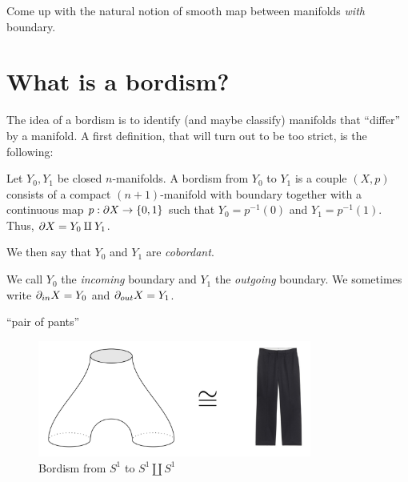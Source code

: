 \begin{exercise}
    Come up with the natural notion of smooth map between manifolds \emph{with} boundary. 
\end{exercise}

\section{What is a bordism?}

The idea of a bordism is to identify (and maybe classify) manifolds that ``differ'' by a manifold. A first definition, that will turn out to be too strict, is the following:
\begin{defn}
\label{Define Bordism}
    Let $Y_0, Y_1$ be closed $n$-manifolds. A bordism from $Y_0$ to $Y_1$ is a couple $(X,p)$ consists of a compact $(n+1)$-manifold with boundary together with a continuous map $p: \partial X \to \{0,1\}$ such that $Y_0 = p^{-1}(0)$ and $Y_1 = p^{-1}(1)$. Thus, $\partial X = Y_0 \amalg Y_1$.

    \noindent We then say that $Y_0$ and $Y_1$ are \textit{cobordant}.
\end{defn}
\noindent We call $Y_0$ the \textit{incoming} boundary and $Y_1$ the \textit{outgoing} boundary. We sometimes write $\partial_{in} X = Y_0$ and $\partial_{out} X = Y_1$.

\begin{ex}
    ``pair of pants'' %
    \begin{figure}[!ht]
        \centering
        \captionsetup{labelformat=empty, format = hang}
        \begin{measuredfigure}
            \includegraphics[width=9cm]{images/Lecture 2/pants_topological.png} 
            \caption{\small{Bordism from $S^1$ to $S^1\amalg S^1$}}
        \end{measuredfigure}
    \end{figure}
\end{ex}

